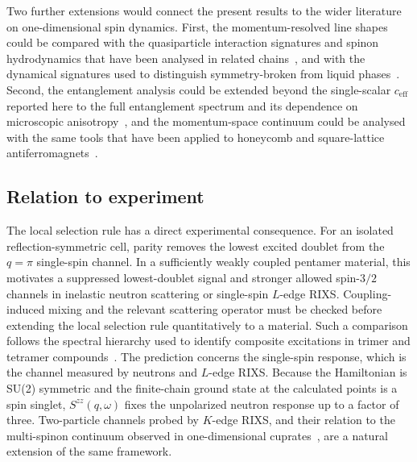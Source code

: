 Two further extensions would connect the present results to the wider literature
on one-dimensional spin dynamics.
First, the momentum-resolved line shapes could be compared with the quasiparticle
interaction signatures and spinon hydrodynamics that have been analysed in
related chains~\cite{keselman2020,balents2020,wang2022hydro}, and with the
dynamical signatures used to distinguish symmetry-broken from liquid
phases~\cite{drescher2023,li2023dqcpsteer}.
Second, the entanglement analysis could be extended beyond the single-scalar
$c_{\mathrm{eff}}$ reported here to the full entanglement spectrum and its
dependence on microscopic anisotropy~\cite{kargarian2008}, and the momentum-space
continuum could be analysed with the same tools that have been applied to
honeycomb and square-lattice
antiferromagnets~\cite{gu2022honeycomb,wu2022j1j3}.

\subsection{Relation to experiment}

The local selection rule has a direct experimental consequence.
For an isolated reflection-symmetric cell, parity removes the lowest excited
doublet from the $q=\pi$ single-spin channel.
In a sufficiently weakly coupled pentamer material, this motivates a suppressed
lowest-doublet signal and stronger allowed spin-$3/2$ channels in inelastic
neutron scattering or single-spin $L$-edge RIXS.
Coupling-induced mixing and the relevant scattering operator must be checked
before extending the local selection rule quantitatively to a material.
Such a comparison follows the spectral hierarchy used to
identify composite excitations in trimer and tetramer
compounds~\cite{cheng2022trimer,li2025rixstrimer,li2026tetramer,prabhakar2025trimer}.
The prediction concerns the single-spin response, which is the channel measured
by neutrons and $L$-edge RIXS.
Because the Hamiltonian is SU(2) symmetric and the finite-chain ground state at
the calculated points is a spin singlet, $S^{zz}(q,\omega)$ fixes the unpolarized
neutron response up to a factor of three.
Two-particle channels probed by $K$-edge RIXS, and their relation to the
multi-spinon continuum observed in one-dimensional
cuprates~\cite{schlappa2018,ishii2025kedge,kumar2020,forte2011}, are a natural
extension of the same framework.
